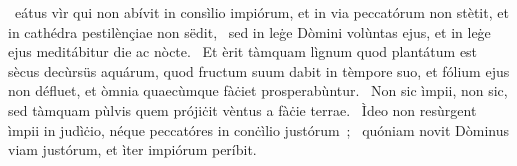{%
~eátus vìr qui non abívit in consìlio impiórum, et in via peccatórum non stètit, et in cathédra pestilènçiae non sëdit, 
~sed in leġe Dòmini volùntas ejus, et in leġe ejus meditábitur die ac nòcte. 
~Et èrit tàmquam lìgnum quod plantátum est sècus decùrsüs aquárum, quod fructum suum dabit in tèmpore suo, et fólium ejus non défluet, et òmnia quaecùmque fàċiet prosperabùntur. 
~Non sic ìmpii, non sic, sed tàmquam pùlvis quem prójiċit vèntus a fàċie terrae. 
~Ìdeo non resùrgent ìmpii in judìċio, néque peccatóres in conċìlio justórum~; 
~quóniam novit Dòminus viam justórum, et ìter impiórum períbit. 
}
